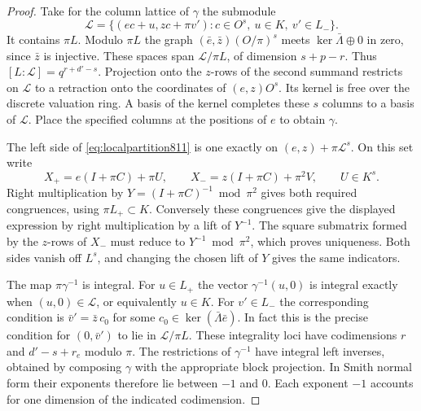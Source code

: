 \documentclass[a4paper,11pt]{article}
\theoremstyle{definition}
\theoremstyle{remark}
\numberwithin{equation}{section}
\begin{document}
\begin{proof}
Take for the column lattice of \(\gamma\) the submodule
\[
 \mathcal L=\{(ec+u,zc+\pi v'):c\in O^s,\ u\in K,\ v'\in L_-\}.
\]
It contains \(\pi L\). Modulo \(\pi L\) the graph
\((\bar e,\bar z)(O/\pi)^s\) meets \(\ker\bar\Lambda\oplus0\)
in zero, since \(\bar z\) is injective. These spaces span
\(\mathcal L/\pi L\), of dimension \(s+p-r\).
Thus \([L:\mathcal L]=q^{r+d'-s}\). Projection onto the
\(z\)-rows of the second summand restricts on \(\mathcal L\)
to a retraction onto the coordinates of \((e,z)O^s\). Its
kernel is free over the discrete valuation ring. A basis of
the kernel completes these \(s\) columns to a basis of
\(\mathcal L\). Place the specified columns at the positions
of \(e\) to obtain \(\gamma\).

The left side of \eqref{eq:localpartition811} is one exactly
on \((e,z)+\pi\mathcal L^s\). On this set write
\[
       X_+=e(I+\pi C)+\pi U,\qquad
       X_-=z(I+\pi C)+\pi^2 V,\qquad U\in K^s .
\]
Right multiplication by \(Y=(I+\pi C)^{-1}\bmod\pi^2\)
gives both required congruences, using \(\pi L_+\subset K\).
Conversely these congruences give the displayed expression by
right multiplication by a lift of \(Y^{-1}\). The square
submatrix formed by the \(z\)-rows of \(X_-\) must reduce to
\(Y^{-1}\bmod\pi^2\), which proves uniqueness. Both sides
vanish off \(L^s\), and changing the chosen lift of \(Y\) gives
the same indicators.

The map \(\pi\gamma^{-1}\) is integral. For \(u\in L_+\) the
vector \(\gamma^{-1}(u,0)\) is integral exactly when
\((u,0)\in\mathcal L\), or equivalently \(u\in K\).
For \(v'\in L_-\) the corresponding condition is
\(\bar v'=\bar z\,c_0\) for some \(c_0\in\ker(\bar\Lambda\bar e)\).
In fact this is the precise condition for \((0,\bar v')\)
to lie in \(\mathcal L/\pi L\). These integrality loci have
codimensions \(r\) and \(d'-s+r_e\) modulo \(\pi\).
The restrictions of \(\gamma^{-1}\) have integral left
inverses, obtained by composing \(\gamma\) with the appropriate
block projection. In Smith normal form their exponents
therefore lie between \(-1\) and \(0\). Each exponent \(-1\)
accounts for one dimension of the indicated codimension.
\end{proof}
\end{document}
